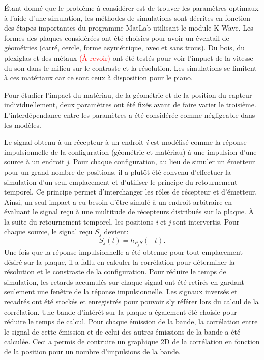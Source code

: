\documentclass[conference]{IEEEtran}
\begin{document}

Étant donné que le problème à considérer est de trouver les paramètres 
optimaux à l'aide d'une simulation, les méthodes de simulations sont décrites
en fonction des étapes importantes du programme MatLab utilisant le module K-Wave.
Les formes des plaques considérées ont été choisies pour avoir un éventail de 
géométries (carré, cercle, forme asymétrique, avec et sans trous). 
Du bois, du plexiglas et des métaux \textcolor{red}{(À revoir)} ont été testés pour 
voir l'impact de la vitesse du son dans le milieu sur le contraste et la résolution. 
Les simulations se limitent à ces matériaux car ce sont ceux à disposition 
pour le piano.

Pour étudier l'impact du matériau, de la géométrie et de la position du capteur
individuellement, deux paramètres ont été fixés avant de faire varier le troisième. 
L'interdépendance entre les paramètres a été considérée comme négligeable dans 
les modèles.

Le signal obtenu à un récepteur à un endroit \textit{i} est modélisé comme la réponse 
impulsionnelle de la configuration (géométrie et matériau) à une impulsion d'une source
à un endroit \textit{j}. %
Pour chaque configuration, au lieu de simuler un émetteur pour un grand nombre de 
positions, il a plutôt été convenu d'effectuer la simulation d'un seul emplacement 
et d'utiliser le principe du retournement temporel. 
Ce principe permet d'interchanger les rôles de récepteur et d'émetteur. 
Ainsi, un seul impact a eu besoin d'être simulé à un endroit arbitraire en évaluant 
le signal reçu à une multitude de récepteurs distribués sur la plaque. 
À la suite du retournement temporel, les positions \textit{i} et \textit{j} 
sont intervertis. 
Pour chaque source, le signal reçu \textit{$S_j$} devient:
\[S_j(t)=h_{P_jS}(-t).\]
Une fois que la réponse impulsionnelle a été obtenue pour tout emplacement désiré 
sur la plaque, il a fallu en calculer la corrélation pour déterminer la résolution 
et le constraste de la configuration. 
Pour réduire le temps de simulation, les retards accumulés sur chaque signal ont été 
retirés en gardant seulement une fenêtre de la réponse impulsionnelle. 
Les signaux inversés et recadrés ont été stockés et enregistrés pour pouvoir s'y 
référer lors du calcul de la corrélation. 
Une bande d'intérêt sur la plaque a également été choisie pour réduire le temps de 
calcul. 
Pour chaque émission de la bande, la corrélation entre le signal de cette émission et
de celui des autres émissions de la bande a été calculée. 
Ceci a permis de contruire un graphique 2D de la corrélation en fonction de la 
position pour un nombre d'impulsions de la bande. 
\end{document}
